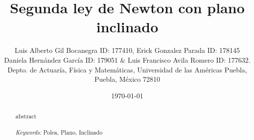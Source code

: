 \documentclass{article}
\begin{document}

\renewcommand{\footrulewidth}{1pt}
\renewcommand{\tablename}{Tabla}
\renewcommand{\figurename}{Figura}


\title{Segunda ley de Newton con plano inclinado}
\author{\small{Luis Alberto Gil Bocanegra ID: 177410, Erick Gonzalez Parada ID: 178145}\\
 \small{Daniela Hernández García ID: 179051 $\&$ Luis Francisco Avila Romero ID: 177632.}\\		%
	   \small{Depto. de Actuaría, Física y Matemáticas, Universidad de las Américas Puebla, Puebla, M\'exico 72810}}
\date{\small{\today}}

\maketitle


\begin{abstract}
abstract
\\
\\
{\it Keywords:}  Polea, Plano, Inclinado 
\\
\\
\end{abstract}

\end{document}
